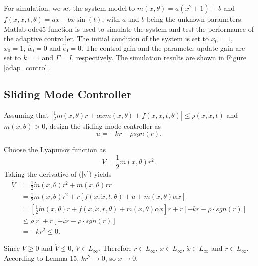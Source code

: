 \documentclass[12pt,a4paper]{article}
\begin{document}
\indent For simulation, we set the system model to $m(x,\theta)=a(x^2+1)+b$ and $f(x,\dot x,t,\theta)=a\dot x+bx\sin(t)$, with $a$ and $b$ being the unknown parameters. Matlab ode45 function is used to simulate the system and test the performance of the adaptive controller. The initial condition of the system is set to $x_0=1$, $\dot x_0=1$, $\hat a_0=0$ and $\hat b_0=0$. The control gain and the parameter update gain are set to $k=1$ and $\Gamma=I$, respectively. The simulation results are shown in Figure \ref{adap_control}.

\subsection{Sliding Mode Controller}

\indent Assuming that $\left|\frac12\dot m(x,\theta)r+\alpha\dot xm(x,\theta)+f(x,\dot x,t,\theta)\right|\le\rho(x,\dot x,t)$ and $m(x,\theta)>0$, design the sliding mode controller as
\begin{equation}
u=-kr-\rho sgn(r).
\end{equation}

\indent Choose the Lyapunov function as
\begin{equation}
V=\frac12m(x,\theta)r^2.
\label{v}
\end{equation}
Taking the derivative of (\ref{v}) yields
\begin{equation}
\begin{aligned}
\dot V&=\frac12\dot m(x,\theta)r^2+m(x,\theta)r\dot r\\
&=\frac12 m(x,\theta)r^2+r\left[f(x,\dot x,t,\theta)+u+m(x,\theta)\alpha\dot x\right]\\
&=\left[\frac12\dot m(x,\theta)r+f(x,\dot x,r,\theta)+m(x,\theta)\alpha\dot x\right]r+r\left[-kr-\rho \cdot sgn(r)\right]\\
&\le \rho |r|+r\left[-kr-\rho \cdot sgn(r)\right]\\
&=-kr^2\le 0.
\end{aligned}
\end{equation}

\indent Since $V\ge 0$ and $\dot V \le 0$, $V\in L_\infty$. Therefore $r\in L_\infty$, $x\in L_\infty$, $\dot x\in L_\infty$ and $\dot r\in L_\infty$. According to Lemma 15, $kr^2\to 0$, so $x\to 0$.
\end{document}
